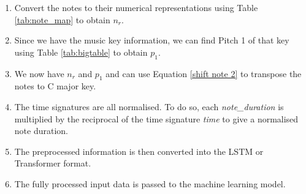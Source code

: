 \begin{enumerate}
    \item Convert the notes to their numerical representations using Table \ref{tab:note_map} to obtain $n_r$.
    \item Since we have the music key information, we can find Pitch 1 of that key using Table \ref{tab:bigtable} to obtain $p_1$.
    \item We now have $n_r$ and $p_1$ and can use Equation \ref{shift note 2} to transpose the notes to C major key.
    \item The time signatures are all normalised. To do so, each \emph{note\_duration} is multiplied by the reciprocal of the time signature \emph{time} to give a normalised note duration.
    \item The preprocessed information is then converted into the LSTM or Transformer format.
    \item The fully processed input data is passed to the machine learning model.
  \end{enumerate}
